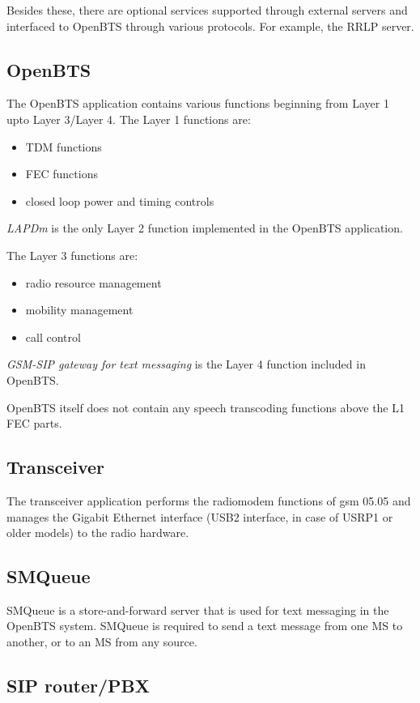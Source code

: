 Besides these, there are optional services supported through 
external servers and interfaced to OpenBTS through various protocols. For 
example, the RRLP server.

\subsection{OpenBTS}
The OpenBTS application contains various functions beginning from Layer 1 upto
Layer 3/Layer 4. The Layer 1 functions are:
\begin{itemize}
\item TDM functions
\item FEC functions
\item closed loop power and timing controls
\end{itemize}

\emph{LAPDm} is the only Layer 2 function implemented in the OpenBTS 
application.

The Layer 3 functions are:
\begin{itemize}
\item radio resource management
\item mobility management
\item call control
\end{itemize}

\emph{GSM-SIP gateway for text messaging} is the Layer 4 function included
in OpenBTS.

OpenBTS itself does not contain any speech transcoding
functions above the L1 FEC parts.


\subsection{Transceiver}
The transceiver application performs the radiomodem functions of \gls{gsm} 05.05 and manages 
the Gigabit Ethernet interface
(USB2 interface, in case
of USRP1 or older models) to the radio hardware.

\subsection{SMQueue}
SMQueue is a store-and-forward server that is used for 
text messaging in the OpenBTS system. SMQueue is required to send 
a text message from one MS to another, or to an MS from any source.

\subsection{SIP router/PBX}

